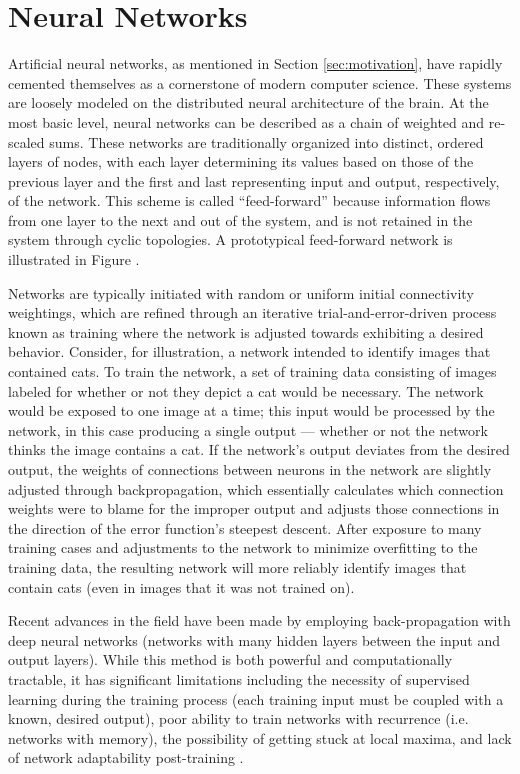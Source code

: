\section{Neural Networks}

Artificial neural networks, as mentioned in Section \ref{sec:motivation}, have rapidly cemented themselves as a cornerstone of modern computer science. These systems are loosely modeled on the distributed neural architecture of the brain. At the most basic level, neural networks can be described as a chain of weighted and re-scaled sums. These networks are traditionally organized into distinct, ordered layers of nodes, with each layer determining its values based on those of the previous layer and the first and last representing input and output, respectively, of the network. This scheme is called ``feed-forward'' because information flows from one layer to the next and out of the system, and is not retained in the system through cyclic topologies. A prototypical feed-forward network is illustrated in Figure .

Networks are typically initiated with random or uniform initial connectivity weightings, which are refined through an iterative trial-and-error-driven process known as training where the network is adjusted towards exhibiting a desired behavior. Consider, for illustration, a network intended to identify images that contained cats. To train the network, a set of training data consisting of images labeled for whether or not they depict a cat would be necessary. The network would be exposed to one image at a time; this input would be processed by the network, in this case producing a single output --- whether or not the network thinks the image contains a cat. If the network's output deviates from the desired output, the weights of connections between neurons in the network are slightly adjusted through backpropagation, which essentially calculates which connection weights were to blame for the improper output and adjusts those connections in the direction of the error function's steepest descent. After exposure to many training cases and adjustments to the network to minimize overfitting to the training data, the resulting network will more reliably identify images that contain cats (even in images that it was not trained on).

Recent advances in the field have been made by employing back-propagation with deep neural networks (networks with many hidden layers between the input and output layers). While this method is both powerful and computationally tractable, it has significant limitations including the necessity of supervised learning during the training process (each training input must be coupled with a known, desired output), poor ability to train networks with recurrence (i.e. networks with memory), the possibility of getting stuck at local maxima, and lack of network adaptability post-training \cite[pg 312, 364]{Downing2015IntelligenceSystems}. 

